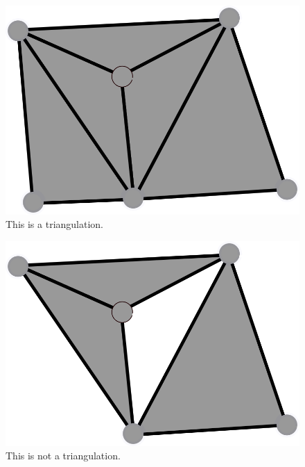 \documentclass[a4paper,10pt]{article}
\begin{document}
\begin{figure}
  \centering
  
  \includegraphics[scale=2]{Trig1}
  \caption{\label{Trig1} This is a triangulation.}
\end{figure}

\begin{figure}
  \centering
  \includegraphics[scale=2]{NotTrig1}
  \caption{\label{NotTrig1} This is not a triangulation.}
\end{figure}
\end{document}
